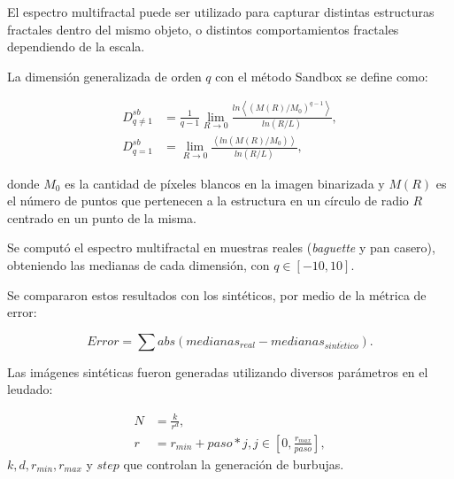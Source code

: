 \documentclass[spanish]{beamer}
\begin{document}

\begin{frame}

El espectro multifractal puede ser utilizado para capturar distintas estructuras fractales dentro del mismo objeto, o distintos comportamientos fractales dependiendo de la escala.

La dimensión generalizada de orden $q$ con el método Sandbox se define como:

 \begin{align*}
D_{q\ne 1}^{sb} &= \frac{1}{q-1} \lim_{R \rightarrow 0}{
\frac{ln   { \left\langle  (M(R)/M_{0})^{q-1} \right\rangle   }}
{ln {(R/L)}       }},\\
D_{q=1}^{sb} &= \lim_{R \rightarrow 0}{
\frac{ \left\langle ln   { (M(R)/M_{0})  }  \right\rangle}
{ln {(R/L)}       }},
\end{align*}

\noindent donde $M_{0}$ es la cantidad de píxeles blancos en la imagen binarizada y $M(R)$ es el número de puntos que pertenecen a la estructura en un círculo de radio $R$ centrado en un punto de la misma.
\end{frame}

\begin{frame}
Se computó el espectro multifractal en muestras reales ({\em baguette} y pan casero), obteniendo las medianas de cada dimensión, con $q \in [-10,10]$.

Se compararon estos resultados con los sintéticos, por medio de la métrica de error:

\begin{equation*}
Error = \displaystyle \sum abs(medianas_{real}-medianas_{sint\acute{e}tico}).
\end{equation*}

Las imágenes sintéticas fueron generadas utilizando diversos parámetros en el leudado:

\begin{align*}
N &= \frac{k}{r^{d}},\\ r &= r_{min}+paso*j, j \in [0,\frac{r_{max}}{paso}],
\end{align*}
\noindent $k,d,r_{min},r_{max}$ y $step$ que controlan la generación de burbujas.

\end{frame}
\end{document}
